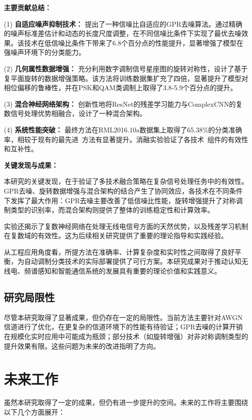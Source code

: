 \documentclass[conference]{IEEEtran}
\begin{document}
\textbf{主要贡献总结：}

(1) \textbf{自适应噪声抑制技术：} 提出了一种信噪比自适应的GPR去噪算法。通过精确的噪声标准差估计和动态的长度尺度调整，在不同信噪比条件下实现了最优去噪效果。该技术在低信噪比条件下带来了6.8个百分点的性能提升，显著增强了模型在强噪声环境下的分类能力。

(2) \textbf{几何属性数据增强：} 充分利用数字调制信号星座图的旋转对称性，设计了基于复平面旋转的数据增强策略。该方法将训练数据集扩充了四倍，显著提升了模型对相位偏移的鲁棒性，并在PSK和QAM类调制上取得了3.8-5.9个百分点的提升。

(3) \textbf{混合神经网络架构：} 创新性地将ResNet的残差学习能力与ComplexCNN的复数信号处理优势相融合，设计了一种混合架构。

(4) \textbf{系统性能突破：} 最终方法在RML2016.10a数据集上取得了65.38\%的分类准确率，相较于现有的最先进~方法有显著提升。消融实验验证了各技术~组件的有效性和互补性。

\textbf{关键发现与成果：}

本研究的关键发现，在于验证了多技术融合策略在复杂信号处理任务中的有效性。GPR去噪、旋转数据增强与混合架构的结合产生了协同效应，各技术在不同条件下发挥了最大作用：GPR去噪主要改善了低信噪比性能，旋转增强提升了对称调制类型的识别率，而混合架构则提供了整体的训练稳定性和计算效率。

实验还揭示了复数神经网络在处理无线电信号方面的天然优势，以及残差学习机制在复数域的有效性。这为后续相关研究提供了重要的理论指导和实践经验。

从工程应用角度看，所提方法在准确率、计算复杂度和实时性之间取得了良好平衡，为自动调制分类技术的实际部署提供了可行方案。本研究成果对于推动认知无线电、频谱感知和智能通信系统的发展具有重要的理论价值和实践意义。

\subsection{研究局限性}

尽管本研究取得了显著成果，但仍存在一定的局限性。当前方法主要针对AWGN信道进行了优化，在更复杂的信道环境下的性能有待验证；GPR去噪的计算开销在规模化实时应用中可能成为瓶颈；部分技术（如旋转增强）对非对称调制类型的提升效果有限。这些问题为未来的改进指明了方向。

\section{未来工作}
虽然本研究取得了一定的成果，但仍有进一步提升的空间。未来的工作将主要围绕以下几个方面展开：
\end{document}
